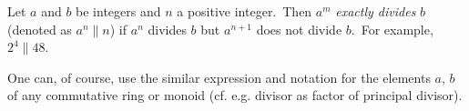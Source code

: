\documentclass[12pt]{article}
\begin{document}
 

Let $a$ and $b$ be integers and $n$ a positive integer.\,  Then $a^m$ \emph{exactly divides} $b$ (denoted as $a^n \parallel n$) if $a^n$ divides $b$ but $a^{n+1}$ does not divide $b$.\, For example,\, $2^4 \parallel 48$.

One can, of course, use the similar expression and notation for the elements $a$, $b$ of any commutative ring or monoid (cf. e.g. divisor as factor of principal divisor).

\end{document}
